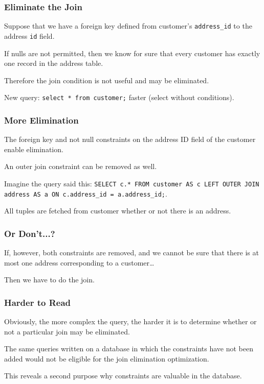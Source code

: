 \begin{frame}
\frametitle{Eliminate the Join}

Suppose that we have a foreign key defined from customer's \texttt{address\_id} to the address \texttt{id} field. 

If nulls are not permitted, then we know for sure that every customer has exactly one record in the address table.

Therefore the join condition is not useful and may be eliminated. 

New query: \texttt{select * from customer;} faster (select without conditions).


\end{frame}

\begin{frame}
\frametitle{More Elimination}

The foreign key and not null constraints on the address ID field of the customer enable elimination.

An outer join constraint can be removed as well.

Imagine the query said this: \texttt{SELECT c.* FROM customer AS c LEFT OUTER JOIN address AS a ON c.address\_id = a.address\_id;}. 

All tuples are fetched from customer whether or not there is an address. 

\end{frame}

\begin{frame}
\frametitle{Or Don't...?}

If, however, both constraints are removed, and we cannot be sure that there is at most one address corresponding to a customer\ldots

Then we have to do the join.


\end{frame}

\begin{frame}
\frametitle{Harder to Read}
Obviously, the more complex the query, the harder it is to determine whether or not a particular join may be eliminated. 

The same queries written on a database in which the constraints have not been added would not be eligible for the join elimination optimization. 

This reveals a second purpose why constraints are valuable in the database.

\end{frame}

